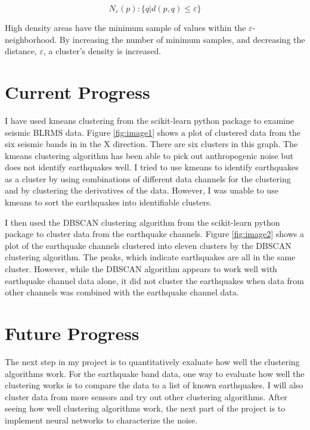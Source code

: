 \documentclass[colorlinks=true,pdfstartview=FitV,linkcolor=blue,
            citecolor=red,urlcolor=magenta]{ligodoc}
\begin{document}
\[N_\varepsilon(p):\{q|d(p,q) \leq \varepsilon\}\]

\par High density areas have the minimum sample of values within the $\varepsilon$-neighborhood. By increasing the number of minimum samples, and decreasing the distance, $\varepsilon$, a cluster's density is increased. \cite{Citation2}\cite{Citation3}

\section{Current Progress}

\indent

\par I have used kmeans clustering from the scikit-learn python package \cite{Citation2} to examine seismic BLRMS data. Figure \ref{fig:image1} shows a plot of clustered data from the six seismic bands in in the X direction. There are six clusters in this graph. The kmeans clustering algorithm has been able to pick out anthropogenic noise but does not identify earthquakes well. I tried to use kmeans to identify earthquakes as a cluster by using combinations of different data channels for the clustering and by clustering the derivatives of the data. However, I was unable to use kmeans to sort the earthquakes into identifiable clusters.

\par I then used the DBSCAN clustering algorithm from the scikit-learn python package \cite{Citation2} to cluster data from the earthquake channels. Figure \ref{fig:image2} shows a plot of the earthquake channels clustered into eleven clusters by the DBSCAN clustering algorithm. The peaks, which indicate earthquakes are all in the same cluster. However, while the DBSCAN algorithm appears to work well with earthquake channel data alone, it did not cluster the earthquakes when data from other channels was combined with the earthquake channel data.

\section{Future Progress}

\indent

\par The next step in my project is to quantitatively exaluate how well the clustering algorithms work. For the earthquake band data, one way to evaluate how well the clustering works is to compare the data to a list of known earthquakes. I will also cluster data from more sensors and try out other clustering algorithms. After seeing how well clustering algorithms work, the next part of the project is to implement neural networks to characterize the noise. 
\end{document}
